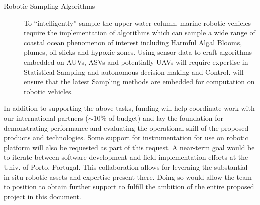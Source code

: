 \begin{description}
\item[Robotic Sampling Algorithms] To ``intelligently'' sample the upper
  water-column, marine robotic vehicles require the implementation of
  algorithms which can sample a wide range of coastal ocean phenomenon
  of interest including Harmful Algal Blooms, plumes, oil slicks and
  hypoxic zones. Using sensor data to craft algorithms embedded on AUVs,
  ASVs and potentially UAVs will require expertise in Statistical
  Sampling and autonomous decision-making and Control. \pro will ensure
  that the latest Sampling methods are embedded for computation on
  robotic vehicles.

\end{description}

\noindent
In addition to supporting the above tasks, \kck funding will help
coordinate work with our international partners ($\sim 10\%$ of budget)
and lay the foundation for demonstrating performance and evaluating the
operational skill of the proposed products and technologies. Some
support for instrumentation for use on robotic platform will also be
requested as part of this request. A near-term goal would be to iterate
between software development and field implementation efforts at the
Univ. of Porto, Portugal.  This collaboration allows for leveraing the
substantial in-situ robotic assets and expertise present there.  Doing
so would allow the team to position \pro to obtain further support to
fulfill the ambition of the entire proposed project in this document.

